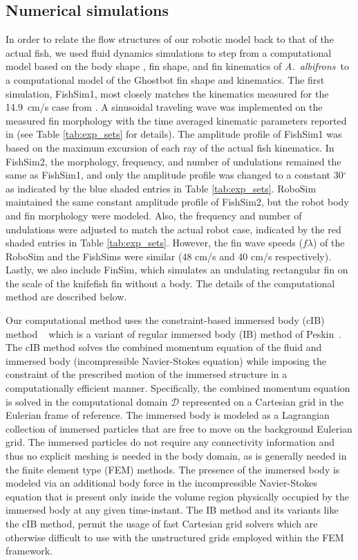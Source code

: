 \documentclass[onecolumn]{IEEEtran}
\def \cD{\mathcal{D}}
\newcommand{\albif}{{\it A.~albifrons}}
\begin{document}
\subsection{Numerical simulations}

In order to relate the flow structures of our robotic model back to that
of the actual fish, we used fluid dynamics simulations to step from a
computational model based on the body shape \citep*{MacI00a}, fin shape,
and fin kinematics \citep*{Ruiz13a} of \albif ~to a computational model of
the Ghostbot fin shape and kinematics. The first simulation, FishSim1, most
closely matches the kinematics measured for the 14.9~cm/s case from
\citet*{Ruiz13a}. A sinusoidal traveling wave was implemented on the
measured fin morphology with the time averaged kinematic parameters
reported in \citet*{Ruiz13a} (see Table \ref{tab:exp_sets} for details).  
The amplitude profile of FishSim1 was based on the maximum excursion of each ray of the actual fish kinematics.
In FishSim2, the morphology, frequency, and number of undulations remained
the same as FishSim1, and only the amplitude profile was changed to a
constant 30$^\circ$ as indicated by the blue shaded entries in Table
\ref{tab:exp_sets}. RoboSim maintained the same constant amplitude profile
of FishSim2, but the robot body and fin morphology were modeled. Also, the
frequency and number of undulations were adjusted to match the actual robot
case, indicated by the red shaded entries in Table \ref{tab:exp_sets}.
However, the fin wave speeds ($f\lambda$) of the RoboSim and the FishSims were similar (48
cm/s and 40 cm/s respectively). Lastly, we also include FinSim, which
simulates an undulating rectangular fin on the scale of the knifefish fin
without a body. The details of the computational method are described
below.

Our computational method uses the constraint-based immersed body (cIB) 
method ~\citep*{Bhal13,Shar05a,Pata00a,Pata01a,Pata05a,Glow99a,Shir09a,Cure10a} 
which is a variant of regular immersed body (IB) method of Peskin~\citep*{Pesk2002}. 
The cIB method solves the combined momentum equation of the fluid and immersed body 
(incompressible Navier-Stokes equation) while imposing the constraint of the prescribed 
motion of the immersed structure in a computationally efficient manner. Specifically, the 
combined momentum equation is solved in the computational domain $\cD$ represented on 
a Cartesian grid in the Eulerian frame of reference. The immersed body is modeled as 
a Lagrangian collection of immersed particles that are free to move on the background 
Eulerian grid. The immersed particles do not require any connectivity information and thus
no explicit meshing is needed in the body domain, as is generally needed in the finite element 
type (FEM) methods. The presence of the immersed body is modeled via an additional body force in the 
incompressible Navier-Stokes equation that is present only inside the volume region 
physically occupied by the immersed body at any given time-instant. The IB method and its variants 
like the cIB method, permit the usage of fast Cartesian grid solvers which are otherwise difficult to use
with the unstructured grids employed within the FEM framework. 
\end{document}
